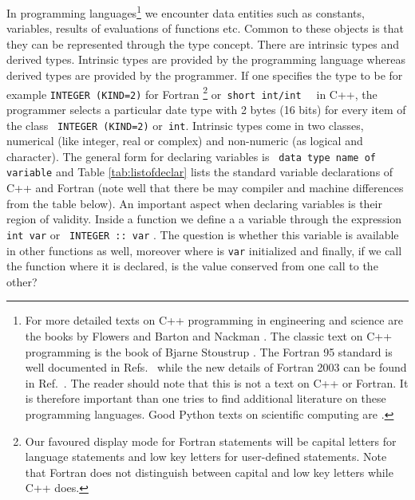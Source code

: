 In programming languages\footnote{For more detailed texts on C++ programming in engineering and
science are the books by Flowers \cite{flowers} and Barton and Nackman \cite{barton}.
The classic text on C++ programming is the book of Bjarne Stoustrup \cite{stoustrup1997}.
The Fortran 95 standard is well documented in Refs.~\cite{f95ref,metcalf1996,marshall1995} 
while the 
new details of Fortran 2003 can be found in Ref.~\cite{f2003}.
The reader should note that this is not a text on C++ or Fortran. 
It is therefore important than one tries to find additional literature on these programming languages. 
Good Python texts on scientific computing 
are \cite{langtangen2006,langtangen2009}.}
we encounter data entities such
as constants, variables, results of evaluations of functions
etc. Common to these objects is that they can be represented
through the type concept. There are intrinsic types and derived
types. Intrinsic types are provided by the programming language
whereas derived types are provided by the programmer.
If one specifies the type to be for example \verb?INTEGER (KIND=2)? 
for Fortran \footnote{Our favoured display mode for Fortran statements
will be capital letters for language statements and low key
letters for user-defined statements. Note that Fortran
does not distinguish between capital and low key letters while
C++ does.}
or\verb? short int/int  ? in C++,
the programmer selects a particular date type with 2 bytes
(16 bits) for every item of the class
\verb? INTEGER (KIND=2)? or\verb? int?. Intrinsic types come
in two classes, numerical (like integer, real or complex)
and non-numeric (as logical and character).
The general form for declaring  variables is 
\verb? data type name of variable?
and Table \ref{tab:listofdeclar} 
lists the standard variable declarations of C++ and Fortran 
(note well that there be may compiler and machine differences from the table below).
An important aspect when declaring variables is their
region of validity.
Inside a function we define a a variable through the expression 
\verb?int var? or \verb? INTEGER :: var? . The question is 
whether this variable is available in
other functions as well, moreover where is 
\verb?var? initialized and finally, if we call the function where
it is declared, is the value conserved from one call to the other?
